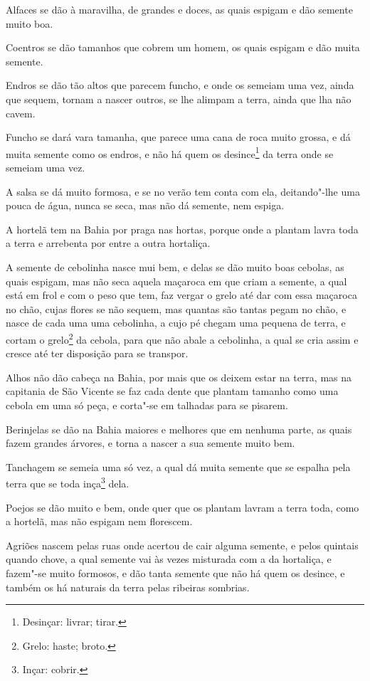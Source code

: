 Alfaces se dão à maravilha, de grandes e doces, as quais espigam e dão semente muito boa.

Coentros se dão tamanhos que cobrem um homem, os quais espigam e dão muita semente.

Endros se dão tão altos que parecem funcho, e onde os semeiam uma vez, ainda que sequem,
tornam a nascer outros, se lhe alimpam a terra, ainda que lha não cavem.

Funcho se dará vara tamanha, que parece uma cana de roca muito grossa, e dá muita semente
como os endros, e não há quem os desince\footnote{ Desinçar: livrar; tirar.} da terra onde
se semeiam uma vez.

A salsa se dá muito formosa, e se no verão tem conta com ela, deitando"-lhe uma pouca de
água, nunca se seca, mas não dá semente, nem espiga.

A hortelã tem na Bahia por praga nas hortas, porque onde a plantam lavra toda a terra e
arrebenta por entre a outra hortaliça.

A semente de cebolinha nasce mui bem, e delas se dão muito boas cebolas, as quais espigam,
mas não seca aquela maçaroca em que criam a semente, a qual está em frol e com o peso que
tem, faz vergar o grelo até dar com essa maçaroca no chão, cujas flores se não sequem, mas
quantas são tantas pegam no chão, e nasce de cada uma uma cebolinha, a cujo pé chegam uma
pequena de terra, e cortam o grelo\footnote{ Grelo: haste; broto.} da cebola, para que não
abale a cebolinha, a qual se cria assim e cresce até ter disposição para se transpor.

Alhos não dão cabeça na Bahia, por mais que os deixem estar na terra, mas na capitania de
São Vicente se faz cada dente que plantam tamanho como uma cebola em uma só peça, e
corta"-se em talhadas para se pisarem.

Berinjelas se dão na Bahia maiores e melhores que em nenhuma parte, as quais fazem grandes
árvores, e torna a nascer a sua semente muito bem.

Tanchagem se semeia uma só vez, a qual dá muita semente que se espalha pela terra que se
toda inça\footnote{ Inçar: cobrir.} dela.


Poejos se dão muito e bem, onde quer que os plantam lavram a terra toda, como a hortelã,
mas não espigam nem florescem.

Agriões nascem pelas ruas onde acertou de cair alguma semente, e pelos quintais quando
chove, a qual semente vai às vezes misturada com a da hortaliça, e fazem"-se muito
formosos, e dão tanta semente que não há quem os desince, e também os há naturais da terra
pelas ribeiras sombrias.

